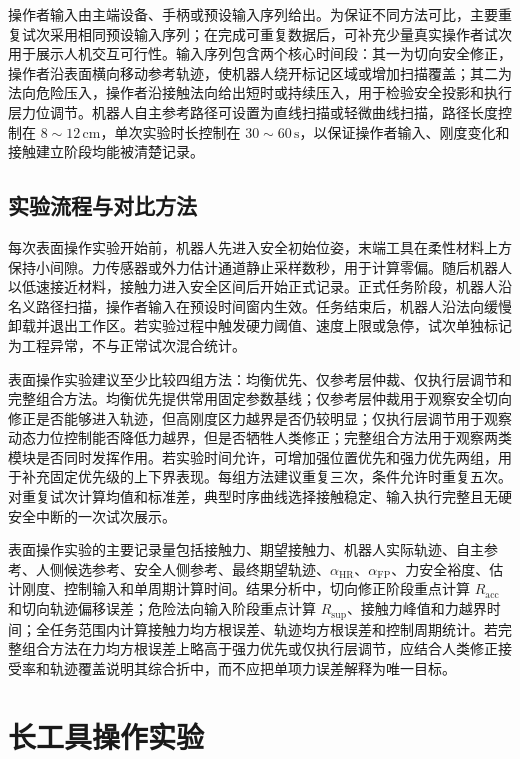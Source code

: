操作者输入由主端设备、手柄或预设输入序列给出。为保证不同方法可比，主要重复试次采用相同预设输入序列；在完成可重复数据后，可补充少量真实操作者试次用于展示人机交互可行性。输入序列包含两个核心时间段：其一为切向安全修正，操作者沿表面横向移动参考轨迹，使机器人绕开标记区域或增加扫描覆盖；其二为法向危险压入，操作者沿接触法向给出短时或持续压入，用于检验安全投影和执行层力位调节。机器人自主参考路径可设置为直线扫描或轻微曲线扫描，路径长度控制在 $8\sim12\,\mathrm{cm}$，单次实验时长控制在 $30\sim60\,\mathrm{s}$，以保证操作者输入、刚度变化和接触建立阶段均能被清楚记录。

\subsection{实验流程与对比方法}
\label{subsec:ch5_surface_protocol}

每次表面操作实验开始前，机器人先进入安全初始位姿，末端工具在柔性材料上方保持小间隙。力传感器或外力估计通道静止采样数秒，用于计算零偏。随后机器人以低速接近材料，接触力进入安全区间后开始正式记录。正式任务阶段，机器人沿名义路径扫描，操作者输入在预设时间窗内生效。任务结束后，机器人沿法向缓慢卸载并退出工作区。若实验过程中触发硬力阈值、速度上限或急停，试次单独标记为工程异常，不与正常试次混合统计。

表面操作实验建议至少比较四组方法：均衡优先、仅参考层仲裁、仅执行层调节和完整组合方法。均衡优先提供常用固定参数基线；仅参考层仲裁用于观察安全切向修正是否能够进入轨迹，但高刚度区力越界是否仍较明显；仅执行层调节用于观察动态力位控制能否降低力越界，但是否牺牲人类修正；完整组合方法用于观察两类模块是否同时发挥作用。若实验时间允许，可增加强位置优先和强力优先两组，用于补充固定优先级的上下界表现。每组方法建议重复三次，条件允许时重复五次。对重复试次计算均值和标准差，典型时序曲线选择接触稳定、输入执行完整且无硬安全中断的一次试次展示。

表面操作实验的主要记录量包括接触力、期望接触力、机器人实际轨迹、自主参考、人侧候选参考、安全人侧参考、最终期望轨迹、$\alpha_{\mathrm{HR}}$、$\alpha_{\mathrm{FP}}$、力安全裕度、估计刚度、控制输入和单周期计算时间。结果分析中，切向修正阶段重点计算 $R_{\mathrm{acc}}$ 和切向轨迹偏移误差；危险法向输入阶段重点计算 $R_{\mathrm{sup}}$、接触力峰值和力越界时间；全任务范围内计算接触力均方根误差、轨迹均方根误差和控制周期统计。若完整组合方法在力均方根误差上略高于强力优先或仅执行层调节，应结合人类修正接受率和轨迹覆盖说明其综合折中，而不应把单项力误差解释为唯一目标。

\section{长工具操作实验}
\label{sec:ch5_long_tool_experiment}

